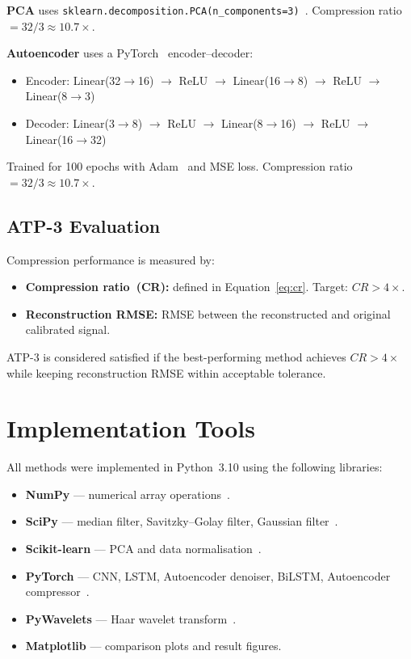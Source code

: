 \textbf{PCA} uses \texttt{sklearn.decomposition.PCA(n\_components=3)}~\cite{scikit-learn, jolliffe2002principal}. Compression ratio~$= 32/3 \approx 10.7\times$.

\textbf{Autoencoder} uses a PyTorch~\cite{pytorch} encoder--decoder:
\begin{itemize}[nosep]
\item Encoder: Linear(32$\to$16) $\to$ ReLU $\to$ Linear(16$\to$8) $\to$ ReLU $\to$ Linear(8$\to$3)
\item Decoder: Linear(3$\to$8) $\to$ ReLU $\to$ Linear(8$\to$16) $\to$ ReLU $\to$ Linear(16$\to$32)
\end{itemize}
Trained for 100 epochs with Adam~\cite{kingma2014adam} and MSE loss. Compression ratio~$= 32/3 \approx 10.7\times$.

\subsection{ATP-3 Evaluation}

Compression performance is measured by:
\begin{itemize}[leftmargin=2em, nosep]
\item \textbf{Compression ratio~(CR):} defined in Equation~\eqref{eq:cr}. Target: $CR > 4\times$.
\item \textbf{Reconstruction RMSE:} RMSE between the reconstructed and original calibrated signal.
\end{itemize}

ATP-3 is considered satisfied if the best-performing method achieves $CR > 4\times$ while keeping reconstruction RMSE within acceptable tolerance.

\section{Implementation Tools}
\label{sec:tools}

All methods were implemented in Python~3.10 using the following libraries:

\begin{itemize}[leftmargin=2em, nosep]
\item \textbf{NumPy} --- numerical array operations~\cite{scipy}.
\item \textbf{SciPy} --- median filter, Savitzky--Golay filter, Gaussian filter~\cite{scipy, savitzky1964smoothing}.
\item \textbf{Scikit-learn} --- PCA and data normalisation~\cite{scikit-learn}.
\item \textbf{PyTorch} --- CNN, LSTM, Autoencoder denoiser, BiLSTM, Autoencoder compressor~\cite{pytorch}.
\item \textbf{PyWavelets} --- Haar wavelet transform~\cite{pywavelets}.
\item \textbf{Matplotlib} --- comparison plots and result figures.
\end{itemize}

